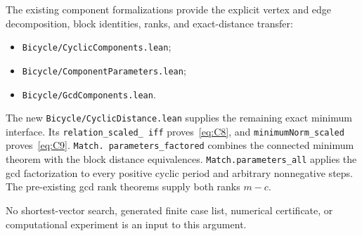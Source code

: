 \documentclass{article}
\numberwithin{equation}{section}
\begin{document}
\begin{sloppypar}
The existing component formalizations provide the explicit vertex
and edge decomposition, block identities, ranks, and exact-distance
transfer:
\begin{itemize}
  \item \texttt{Bicycle/\allowbreak CyclicComponents.\allowbreak lean};
  \item \texttt{Bicycle/\allowbreak ComponentParameters.\allowbreak lean};
  \item \texttt{Bicycle/\allowbreak GcdComponents.\allowbreak lean}.
\end{itemize}

The new \texttt{Bicycle/\allowbreak CyclicDistance.\allowbreak lean} supplies the remaining exact
minimum interface. Its \texttt{relation\_\allowbreak scaled\_\allowbreak
iff} proves~\eqref{eq:C8}, and
\texttt{minimumNorm\_\allowbreak scaled} proves~\eqref{eq:C9}. \texttt{Match.\allowbreak
parameters\_\allowbreak factored}
combines
the connected minimum theorem with the block distance equivalences.
\texttt{Match.\allowbreak parameters\_\allowbreak all} applies the gcd factorization to every
positive cyclic period and arbitrary nonnegative steps. The
pre-existing gcd rank theorems supply both ranks \(m-c\).

No shortest-vector search, generated finite case list, numerical
certificate, or computational experiment is an input to this
argument.
\end{sloppypar}
\end{document}

